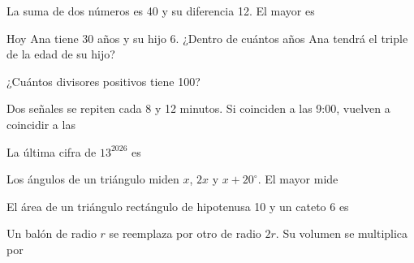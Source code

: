 \begin{ejercicios}
\item La suma de dos números es 40 y su diferencia 12. El mayor es
\item Hoy Ana tiene 30 años y su hijo 6. ¿Dentro de cuántos años Ana tendrá el triple de la edad de su hijo?
\item ¿Cuántos divisores positivos tiene 100?
\item Dos señales se repiten cada 8 y 12 minutos. Si coinciden a las 9:00, vuelven a coincidir a las
\item La última cifra de $13^{2026}$ es
\item Los ángulos de un triángulo miden $x$, $2x$ y $x + 20^\circ$. El mayor mide
\item El área de un triángulo rectángulo de hipotenusa 10 y un cateto 6 es
\item Un balón de radio $r$ se reemplaza por otro de radio $2r$. Su volumen se multiplica por
\end{ejercicios}
\makeatother
